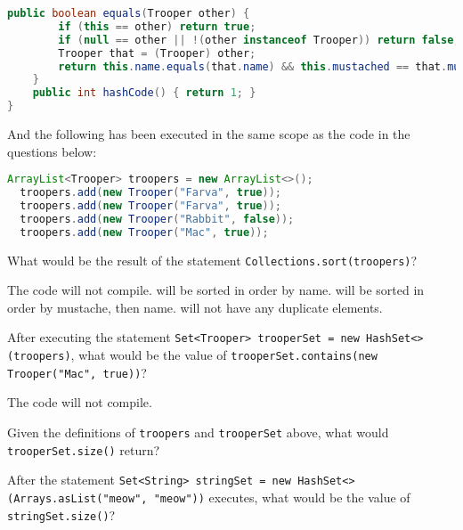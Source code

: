 \documentclass[addpoints,9pt]{exam}
\begin{document}
\begin{questions}
\begin{lstlisting}[language=Java]
    public boolean equals(Trooper other) {
        if (this == other) return true;
        if (null == other || !(other instanceof Trooper)) return false;
        Trooper that = (Trooper) other;
        return this.name.equals(that.name) && this.mustached == that.mustached;
    }
    public int hashCode() { return 1; }
}
\end{lstlisting}
And the following has been executed in the same scope as the code in the questions below:
\begin{lstlisting}[language=Java]
  ArrayList<Trooper> troopers = new ArrayList<>();
  troopers.add(new Trooper("Farva", true));
  troopers.add(new Trooper("Farva", true));
  troopers.add(new Trooper("Rabbit", false));
  troopers.add(new Trooper("Mac", true));
\end{lstlisting}



\question[3] What would be the result of the statement   {\tt Collections.sort(troopers)}?

\begin{choices}
\correctchoice The code will not compile.
 will be sorted in order by name.
 will be sorted in order by mustache, then name.
 will not have any duplicate elements.
\end{choices}

\question[3] After executing the statement {\tt Set<Trooper> trooperSet = new HashSet<>(troopers)}, what would be the value of {\tt trooperSet.contains(new Trooper("Mac", true))}?

\begin{choices}
\choice The code will not compile.
\end{choices}

\question[3] Given the definitions of {\tt troopers} and {\tt trooperSet} above, what would {\tt trooperSet.size()} return?

\begin{choices}

\end{choices}

\question[3] After the statement {\tt Set<String> stringSet = new HashSet<>(Arrays.asList("meow", "meow"))} executes, what would be the value of {\tt stringSet.size()}?

\begin{choices}
\end{choices}


\end{questions}
\end{document}
